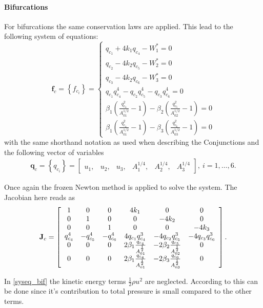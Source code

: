 \documentclass[a4paper, oneside]{discothesis}
\begin{document}
\paragraph{Bifurcations} \label{par:bifurcations}
For bifurcations the same conservation laws are applied.
This lead to the following system of equations:
$$
\mathbf{f}_c=\left\{f_{c_i}\right\}=\left\{\begin{array}{l}
		q_{c_1}+4 k_1 q_{c_4}-W_1^*=0 \\
		q_{c_2}-4 k_2 q_{c_5}-W_2^*=0 \\
		q_{c_3}-4 k_2 q_{c_6}-W_3^*=0 \\
		q_{c_1} q_{c_4}^4-q_{c_2} q_{c_5}^4-q_{c_3} q_{c_6}^4=0 \\
		\beta_1\left(\frac{q_{c_4}^2}{A_{01}^{1 / 2}}-1\right)-\beta_2\left(\frac{q_{c_5}^2}{A_{02}^{1 / 2}}-1\right)=0 \\
		\beta_1\left(\frac{q_{c_4}^2}{A_{01}^{1 / 2}}-1\right)-\beta_3\left(\frac{q_{c_6}^2}{A_{03}^{1 / 2}}-1\right)=0 
\end{array}\right. \label{syseq_bif}
$$
with the same shorthand notation as used when describing the Conjunctions and the following vector of variables
$$
\begin{aligned}
 \mathbf{q}_c=\left\{q_{c_i}\right\}=\left[\begin{array}{llllll}
		u_1, & u_2, & u_3, & A_1^{1 / 4}, & A_2^{1 / 4}, & A_3^{1 / 4}
\end{array}\right], \ i=1, \ldots, 6. 
\end{aligned}
$$

Once again the frozen Newton method is applied to solve the system.
The Jacobian here reads as
$$\mathbf{J}_{c}=\left[\begin{array}{c c c c c c}
		1&0&0&4k_1&0&0\\
		0&1&0&0&-4k_2&0\\
		0&0&1&0&0&-4k_3\\
		q_{c_4}^4 & -q_{c_5}^4 & -q_{c_6}^4 & 4q_{c_1}q_{c_4}^3 & -4q_{c_2}q_{c_5}^3 & -4q_{c_3}q_{c_6}^3 \\
		0 & 0 & 0 & 2\beta_1\frac{q_{c_4}}{A_{01}^{\frac{1}{2}}} & -2\beta_2\frac{q_{c_5}}{A_{02}^{\frac{1}{2}}} & 0\\
		0 & 0 & 0 & 2\beta_1\frac{q_{c_4}}{A_{01}^{\frac{1}{2}}} & -2\beta_3\frac{q_{c_6}}{A_{03}^{\frac{1}{2}}} & 0\\
	\end{array} 
\right].
$$

In \ref{syseq_bif} the kinetic energy terms $\frac{1}{2} \rho u^2$ are neglected.
	According to \cite{Formaggia2003OnedimensionalMF} this can be done since it's contribution to total pressure is small compared to the other terms.
\end{document}
